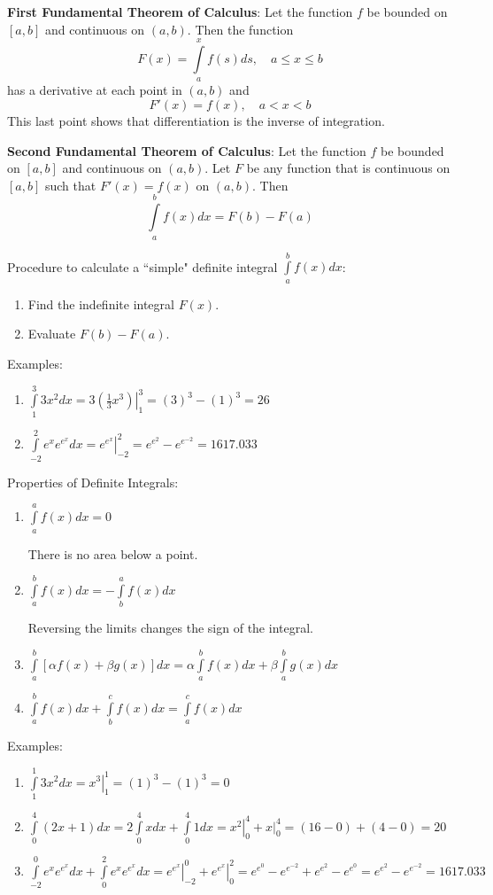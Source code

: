 \documentclass[11pt]{article}
\newcommand{\be}{\begin{enumerate}}
\newcommand{\ee}{\end{enumerate}}
\newcommand{\pbt}{\parbox[t]{2in}}
\newcommand{\pbff}{\parbox[t]{4in}}
\newcommand{\lint}{\int\limits}
\begin{document}
\item {\bf First Fundamental Theorem of Calculus}:  Let the function $f$
be bounded on $[a,b]$ and continuous on $(a,b)$.  Then the function
$$F(x)=\lint_a^x f(s)ds, \quad a\le x\le b$$ has a derivative at each
point in $(a,b)$ and $$F'(x)=f(x), \quad a<x<b$$  This last point shows
that differentiation is the inverse of integration.

\item {\bf Second Fundamental Theorem of Calculus}:  Let the function
$f$ be bounded on $[a,b]$ and continuous on $(a,b)$.  Let $F$ be any
function that is continuous on $[a,b]$ such that $F'(x)=f(x)$ on
$(a,b)$.  Then $$\lint_a^bf(x)dx = F(b)-F(a)$$

\item Procedure to calculate a ``simple" definite integral $\lint_a^b
f(x)dx$:
  \be
  \item Find the indefinite integral $F(x)$.
  \item Evaluate $F(b)-F(a)$.
  \ee

\item Examples:
  \be
  \item $\lint_1^3 3x^2 dx=  \left. 3\left(\frac{1}{3} x^3\right) \right|_1^3 =
  (3)^3-(1)^3=26$
  \item $\lint_{-2}^2 e^x e^{e^x} dx = \left. e^{e^x} \right|_{-2}^2 =
  e^{e^{2}} -e^{e^{-2}}=1617.033 $
  \ee

\item Properties of Definite Integrals:
  \be
  \item \pbt{$\lint_a^a f(x)dx=0$}\pbff{There is no area below a point.}
  \item \pbt{$\lint_a^b f(x)dx=-\lint_b^a f(x)dx$}\pbff{Reversing the
limits changes the sign of the integral.}
  \item $\lint_a^b [\alpha f(x)+\beta g(x)]dx = \alpha \lint_a^b f(x)dx
+ \beta \lint_a^b g(x)dx$
  \item $\lint_a^b f(x) dx +\lint_b^c f(x)dx = \lint_a^c f(x)dx$
  \ee

\item Examples:
  \be
  \item $\lint_1^1 3x^2 dx = \left. x^3 \right|_1^1 =
 (1)^3-  (1)^3=0$
  \item $\lint_0^4 (2x+1)dx= 2\lint_0^4 x dx + \lint_0^4 1 dx =
\left. x^2 \right|_0^4 +\left. x \right|_0^4 = (16-0)+(4-0)=20 $
  \item $\lint_{-2}^0 e^x e^{e^x} dx + \lint_0^2 e^x e^{e^x} dx =
  \left. e^{e^x} \right|_{-2}^0 + \left. e^{e^x} \right|_{0}^2 =
  e^{e^{0}} -e^{e^{-2}} + e^{e^{2}} -e^{e^{0}}=
  e^{e^{2}} -e^{e^{-2}}=1617.033 $
  \ee
\end{document}
